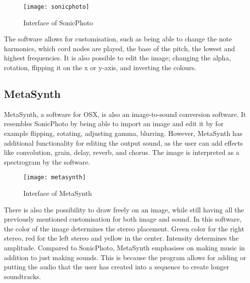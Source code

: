 \begin{figure}[!h] 
\centering
\texttt{[image: sonicphoto]}
\caption{\label{fig:sonicphoto} Interface of SonicPhoto \cite{White2013}}
\end{figure}

The software allows for customisation, such as being able to change the note harmonics, which cord nodes are played, the base of the pitch, the lowest and highest frequencies. It is also possible to edit the image; changing the alpha, rotation, flipping it on the x or y-axis, and inverting the colours. 


\subsection{MetaSynth}\label{sub:metasynth}
MetaSynth, a software for OSX, is also an image-to-sound conversion software. It resembles SonicPhoto by being able to import an image and edit it by for example flipping, rotating, adjusting gamma, blurring. However, MetaSynth has additional functionality for editing the output sound, as the user can add effects like  convolution, grain, delay, reverb, and chorus. The image is interpreted as a spectrogram by the software.

\begin{figure}[!h] 
\centering
\texttt{[image: metasynth]}
\caption{\label{fig:metasynth} Interface of MetaSynth \cite{UISoftware2014}}
\end{figure}

There is also the possibility to draw freely on an image, while still having all the previously mentioned customisation for both image and sound. In this software, the color of the image determines the stereo placement. Green color for the right stereo, red for the left stereo and yellow in the center. Intensity determines the amplitude. 
Compared to SonicPhoto, MetaSynth emphasises on making music in addition to just making sounds. This is because the program allows for adding or putting the audio that the user has created into a sequence to create longer soundtracks.